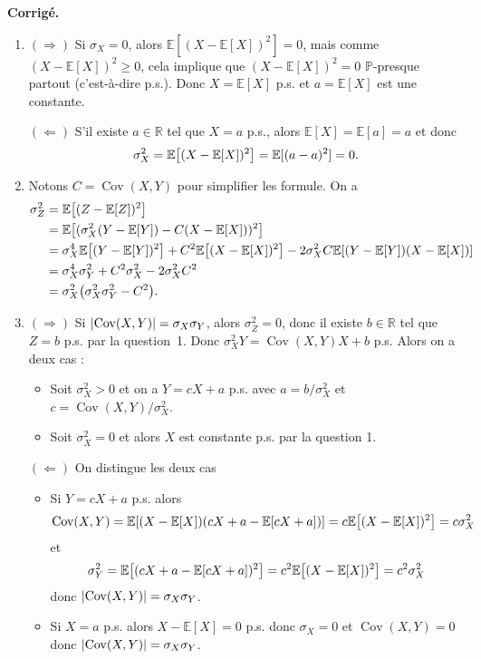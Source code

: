 \documentclass[a4paper,11pt]{article}
\let\originalleft\left
\let\originalright\right
\renewcommand{\left}{\mathopen{}\mathclose\bgroup\originalleft}
\renewcommand{\right}{\aftergroup\egroup\originalright}
\newcommand{\R}{\mathbb{R}}
\renewcommand{\P}{\mathbb{P}}
\newcommand{\E}{\mathbb{E}}
\newcommand{\1}{\mathbbm{1}}
\newcommand{\Ec}[1]{\mathbb{E} \left[#1\right]}
\DeclareMathOperator{\Cov}{Cov}
\newcommand{\abs}[1]{\left\lvert#1\right\rvert}
\theoremstyle{plain}
\theoremstyle{definition}
\renewenvironment{comment}{\medskip\noindent \textcolor{BrickRed}{\textbf{Corrigé.}}}{}
\begin{document}
\begin{comment}
\begin{enumerate}
	\item $(\Rightarrow)$ Si $\sigma_X = 0$, alors $\E[(X-\E[X])^2] = 0$, mais comme $(X-\E[X])^2 \geq 0$, cela implique que $(X-\E[X])^2 = 0$ $\P$-presque partout (c'est-à-dire p.s.).
	      Donc $X = \E[X]$ p.s. et $a = \E[X]$ est une constante.

	      $(\Leftarrow)$ S'il existe $a \in \R$ tel que $X = a$ p.s., alors $\E[X] = \E[a] = a$ et donc
	      \[
		      \sigma_X^2 = \Ec{(X-\E[X])^2}= \E[(a-a)^2] = 0.
	      \]
	\item Notons $C = \Cov(X,Y)$ pour simplifier les formule. On a
	      \begin{align*}
		      \sigma_Z^2
		       & = \Ec{(Z-\E[Z])^2}                                       \\
		       & = \Ec{(\sigma_X^2 (Y-\E[Y]) - C (X-\E[X]))^2}            \\
		       & = \sigma_X^4 \Ec{(Y-\E[Y])^2} + C^2 \Ec{(X-\E[X])^2}
		      - 2 \sigma_X^2 C \Ec{(Y-\E[Y]) (X-\E[X])}                   \\
		       & = \sigma_X^4 \sigma_Y^2 + C^2 \sigma_X^2
		      - 2 \sigma_X^2 C^2                                          \\
		       & = \sigma_X^2 \left( \sigma_X^2 \sigma_Y^2 - C^2 \right).
	      \end{align*}
	\item $(\Rightarrow)$ Si $\abs{\Cov(X,Y)} = \sigma_X \sigma_Y$, alors $\sigma_Z^2 = 0$, donc il existe $b \in \R$ tel que $Z=b$ p.s. par la question~1. Donc $\sigma_X^2 Y = \Cov(X,Y) X + b$ p.s.
	      Alors on a deux cas :
	      \begin{itemize}
		      \item Soit $\sigma_X^2 > 0$ et on a $Y = cX+a$ p.s. avec $a=b/\sigma_X^2$ et $c = \Cov(X,Y)/\sigma_X^2$.
		      \item Soit $\sigma_X^2 = 0$ et alors $X$ est constante p.s. par la question 1.
	      \end{itemize}

	      $(\Leftarrow)$ On distingue les deux cas
	      \begin{itemize}
		      \item Si $Y = cX+a$ p.s. alors
		            \[
			            \Cov(X,Y)
			            = \Ec{(X-\E[X])(cX+a-\E[cX+a]) }
			            = c \Ec{(X-\E[X])^2}
			            = c\sigma_X^2
		            \]
		            et
		            \[
			            \sigma_Y^2
			            = \Ec{(cX+a-\E[cX+a])^2}
			            = c^2 \Ec{(X-\E[X])^2}
			            = c^2 \sigma_X^2
		            \]
		            donc $\abs{\Cov(X,Y)} = \sigma_X \sigma_Y$.
		      \item Si $X = a$ p.s. alors $X - \E[X] = 0$ p.s. donc $\sigma_X = 0$ et $\Cov(X,Y) = 0$ donc $\abs{\Cov(X,Y)} = \sigma_X \sigma_Y$.
	      \end{itemize}
\end{enumerate}
\end{comment}
\end{document}

